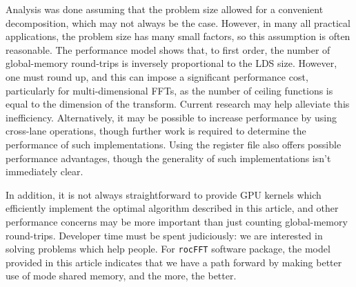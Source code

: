 \documentclass[blind]{gtac}
\begin{document}
Analysis was done assuming that the problem size allowed for a
convenient decomposition, which may not always be the case.  However,
in many all practical applications, the problem size has many small
factors, so this assumption is often reasonable.  The performance
model shows that, to first order, the number of global-memory
round-trips is inversely proportional to the LDS size.  However, one
must round up, and this can impose a significant performance cost,
particularly for multi-dimensional FFTs, as the number of ceiling
functions is equal to the dimension of the transform.  Current
research may help alleviate this inefficiency.  Alternatively, it may
be possible to increase performance by using cross-lane operations,
though further work is required to determine the performance of such
implementations.  Using the register file also offers possible
performance advantages, though the generality of such implementations
isn't immediately clear.

In addition, it is not always straightforward to provide GPU kernels
which efficiently implement the optimal algorithm described in this
article, and other performance concerns may be more important than
just counting global-memory round-trips.  Developer time must be spent
judiciously: we are interested in solving problems which help people.
For \texttt{rocFFT} software package, the model provided in this
article indicates that we have a path forward by making better use
of mode shared memory, and the more, the better.





\begingroup \let\itshape\upshape 
 \endgroup

\end{document}
